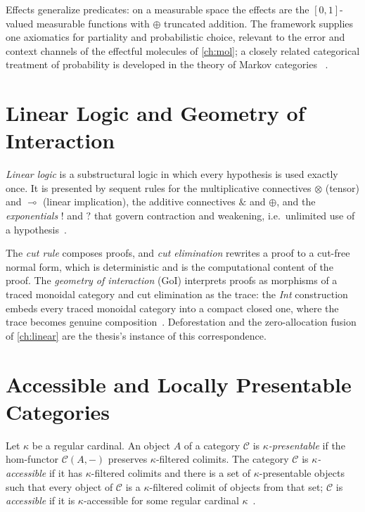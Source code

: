 \begin{remark}
Effects generalize predicates: on a measurable space the effects are the
$[0,1]$-valued measurable functions with $\oplus$ truncated addition. The
framework supplies one axiomatics for partiality and probabilistic choice,
relevant to the error and context channels of the effectful molecules of
\autoref{ch:mol}; a closely related categorical treatment of probability is
developed in the theory of Markov categories
~\cite{arxiv-effectus, arxiv-markov-categories}.
\end{remark}

\section{Linear Logic and Geometry of Interaction}\label{sec:prelim-linear}

\begin{definition}
\emph{Linear logic} is a substructural logic in which every hypothesis is
used exactly once. It is presented by sequent rules for the multiplicative
connectives $\otimes$ (tensor) and $\multimap$ (linear implication), the
additive connectives $\&$ and $\oplus$, and the \emph{exponentials} $!$ and
$?$ that govern contraction and weakening, i.e.\ unlimited use of a
hypothesis~\cite{girard}.
\end{definition}

\begin{remark}
The \emph{cut rule} composes proofs, and \emph{cut elimination} rewrites a
proof to a cut-free normal form, which is deterministic and is the
computational content of the proof. The \emph{geometry of interaction} (GoI)
interprets proofs as morphisms of a traced monoidal category and cut
elimination as the trace: the \emph{Int} construction embeds every traced
monoidal category into a compact closed one, where the trace becomes genuine
composition~\cite{girard, joyalsv, arxiv-linear-logic-goi}. Deforestation
and the zero-allocation fusion of \autoref{ch:linear} are the thesis's
instance of this correspondence.
\end{remark}

\section{Accessible and Locally Presentable Categories}\label{sec:prelim-acc}

\begin{definition}
Let $\kappa$ be a regular cardinal. An object $A$ of a category
$\mathcal{C}$ is \emph{$\kappa$-presentable} if the hom-functor
$\mathcal{C} (A, -)$ preserves $\kappa$-filtered colimits. The category
$\mathcal{C}$ is \emph{$\kappa$-accessible} if it has $\kappa$-filtered
colimits and there is a set of $\kappa$-presentable objects such that every
object of $\mathcal{C}$ is a $\kappa$-filtered colimit of objects from that
set; $\mathcal{C}$ is \emph{accessible} if it is $\kappa$-accessible for some
regular cardinal $\kappa$~\cite{adamek}.
\end{definition}


